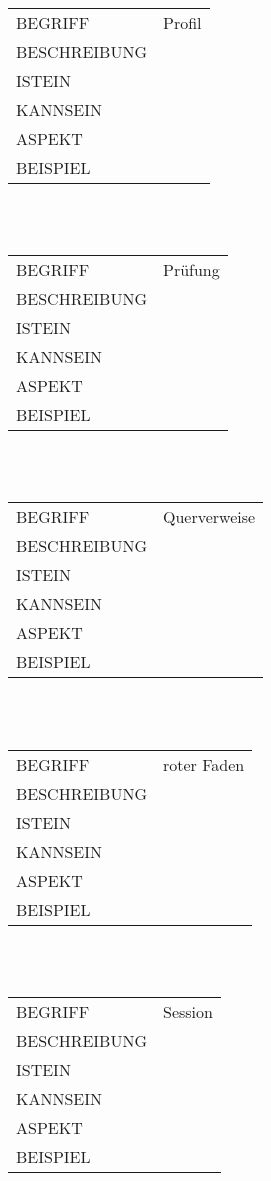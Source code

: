 \documentclass[12pt,a4paper]{article}
\begin{document}
\begin{tabular}{l p{10cm}}
BEGRIFF 	 & Profil \\ 
BESCHREIBUNG & \\ 
ISTEIN   	 & \\
KANNSEIN 	 & \\ 
ASPEKT   	 & \\
BEISPIEL 	 & \\
\hline
\end{tabular}\\\\  

\begin{tabular}{l p{10cm}}
BEGRIFF 	 & Prüfung \\ 
BESCHREIBUNG & \\ 
ISTEIN   	 & \\
KANNSEIN 	 & \\ 
ASPEKT   	 & \\
BEISPIEL 	 & \\
\hline
\end{tabular}\\\\  

\begin{tabular}{l p{10cm}}
BEGRIFF 	 & Querverweise \\ 
BESCHREIBUNG & \\ 
ISTEIN   	 & \\
KANNSEIN 	 & \\ 
ASPEKT   	 & \\
BEISPIEL 	 & \\
\hline
\end{tabular}\\\\  

\begin{tabular}{l p{10cm}}
BEGRIFF 	 & roter Faden \\ 
BESCHREIBUNG & \\ 
ISTEIN   	 & \\
KANNSEIN 	 & \\ 
ASPEKT   	 & \\
BEISPIEL 	 & \\
\hline
\end{tabular}\\\\  

\begin{tabular}{l p{10cm}}
BEGRIFF 	 & Session \\ 
BESCHREIBUNG & \\ 
ISTEIN   	 & \\
KANNSEIN 	 & \\ 
ASPEKT   	 & \\
BEISPIEL 	 & \\
\hline
\end{tabular}\\\\  
\end{document}
